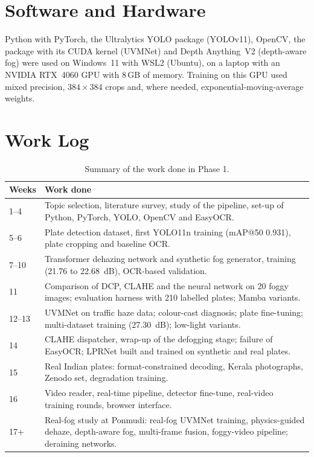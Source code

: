 \section{Software and Hardware}

Python with PyTorch, the Ultralytics YOLO package (YOLOv11), OpenCV, the
 package with its CUDA kernel (UVMNet) and Depth Anything~V2
(depth-aware fog) were used on Windows~11 with WSL2 (Ubuntu), on a laptop with an
NVIDIA RTX~4060 GPU with 8\,GB of memory. Training on this GPU used mixed
precision, $384\times384$ crops and, where needed, exponential-moving-average
weights.

\section{Work Log}

\begin{table}[h]
\centering
\caption{Summary of the work done in Phase 1.}
\small
\begin{tabularx}{\textwidth}{@{}p{1.6cm}X@{}}
\toprule
\textbf{Weeks} & \textbf{Work done}\\
\midrule
1--4 & Topic selection, literature survey, study of the pipeline, set-up of Python, PyTorch, YOLO, OpenCV and EasyOCR.\\
5--6 & Plate detection dataset, first YOLO11n training (mAP@50 0.931), plate cropping and baseline OCR.\\
7--10 & Transformer dehazing network and synthetic fog generator, training (21.76 to 22.68~dB), OCR-based validation.\\
11 & Comparison of DCP, CLAHE and the neural network on 20 foggy images; evaluation harness with 210 labelled plates; Mamba variants.\\
12--13 & UVMNet on traffic haze data; colour-cast diagnosis; plate fine-tuning; multi-dataset training (27.30~dB); low-light variants.\\
14 & CLAHE dispatcher, wrap-up of the defogging stage; failure of EasyOCR; LPRNet built and trained on synthetic and real plates.\\
15 & Real Indian plates: format-constrained decoding, Kerala photographs, Zenodo set, degradation training.\\
16 & Video reader, real-time pipeline, detector fine-tune, real-video training rounds, browser interface.\\
17+ & Real-fog study at Ponmudi: real-fog UVMNet training, physics-guided dehaze, depth-aware fog, multi-frame fusion, foggy-video pipeline; deraining networks.\\
\bottomrule
\end{tabularx}
\end{table}

